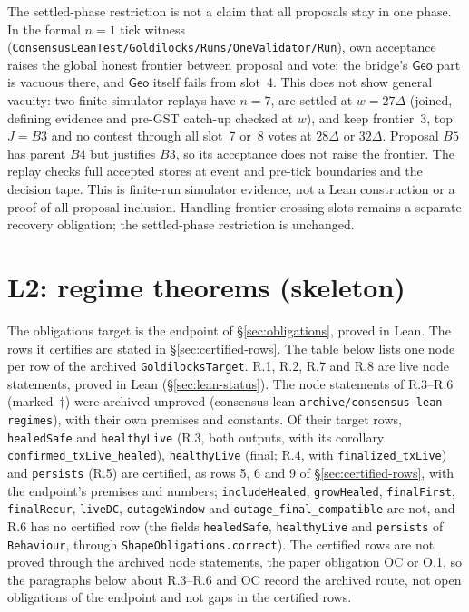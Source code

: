 \documentclass{article}
\begin{document}
The settled-phase restriction is not a claim that all proposals stay in one
phase.  In the formal $n=1$ tick witness (\texttt{ConsensusLeanTest/Goldilocks/Runs/OneValidator/Run}),
own acceptance raises the global honest frontier between proposal and vote;
the bridge's $\mathsf{Geo}$ part is vacuous there, and $\mathsf{Geo}$ itself
fails from slot~4.  This does not show general vacuity: two finite simulator
replays have $n=7$, are settled at $w=27\Delta$ (joined, defining
evidence and pre-GST catch-up checked at $w$), and keep frontier~3, top
$J=B3$ and no contest through all slot~7 or~8 votes at $28\Delta$ or
$32\Delta$.  Proposal $B5$ has parent $B4$ but justifies $B3$, so its
acceptance does not raise the frontier.  The replay checks
full accepted stores at event and pre-tick boundaries and the decision tape.
This is finite-run simulator evidence, not a Lean construction or a proof
of all-proposal inclusion.  Handling frontier-crossing slots remains a
separate recovery obligation; the settled-phase restriction is unchanged.

\section{L2: regime theorems (skeleton)}\label{sec:l2}

\begin{sloppypar}
The obligations target is the endpoint of \S\ref{sec:obligations}, proved in
Lean.  The rows it certifies are stated in \S\ref{sec:certified-rows}.
The table below lists one node per row of the archived
\texttt{GoldilocksTarget}.  R.1, R.2, R.7 and R.8 are live node statements,
proved in Lean (\S\ref{sec:lean-status}).  The node statements of
R.3--R.6 (marked~$\dagger$) were archived unproved (consensus-lean
\texttt{archive/consensus-lean-regimes}), with their own premises and
constants.  Of their target rows, \texttt{healedSafe} and \texttt{healthyLive} (R.3, both outputs, with
its corollary \texttt{confirmed\_txLive\_healed}), \texttt{healthyLive}
(final; R.4, with \texttt{finalized\_txLive}) and \texttt{persists} (R.5)
are certified, as rows 5, 6 and 9 of \S\ref{sec:certified-rows}, with the
endpoint's premises and numbers; \texttt{includeHealed},
\texttt{growHealed}, \texttt{finalFirst}, \texttt{finalRecur},
\texttt{liveDC}, \texttt{outageWindow} and \texttt{outage\_final\_compatible}
are not, and R.6 has no certified row (the fields
\texttt{healedSafe}, \texttt{healthyLive} and \texttt{persists} of
\texttt{Behaviour}, through \texttt{ShapeObligations.correct}).  The
certified rows are not proved through
the archived node statements, the paper obligation OC or O.1, so the
paragraphs below about R.3--R.6 and OC record the archived route, not open
obligations of the endpoint and not gaps in the certified rows.
\end{sloppypar}
\end{document}
